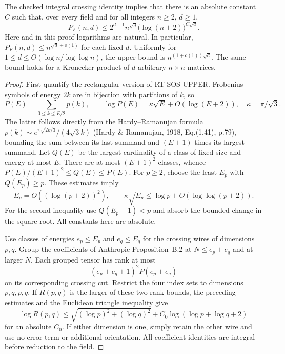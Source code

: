 \begin{proposition}
\label{pg:multicut-upper}
The checked integral crossing identity implies that there is an
absolute constant $C$ such that, over every field and for all integers
$n\geq2$, $d\geq1$,
\[
 P_F(n,d)\leq
 2^{d-1} n^{\sqrt d}\bigl(\log(n+2)\bigr)^{C\sqrt d}.
 \tag{PG-MULTICUT-upper}
\]
Here and in this proof logarithms are natural. In particular,
$P_F(n,d)\leq n^{\sqrt d+o(1)}$ for each fixed $d$. Uniformly for
$1\leq d\leq O(\log n/\log\log n)$, the upper bound is
$n^{(1+o(1))\sqrt d}$. The same bound holds for a Kronecker product
of $d$ arbitrary $n\times n$ matrices.
\end{proposition}
\begin{proof}
First quantify the rectangular version of RT-SOS-UPPER. Frobenius
symbols of energy $2k$ are in bijection with partitions of $k$, so
\[
 P(E)=\sum_{0\leq k\leq E/2}p(k),\qquad
 \log P(E)=\kappa\sqrt E+O(\log(E+2)),\quad
 \kappa=\pi/\sqrt3.
 \tag{PG-MULTICUT-count}
\]
The latter follows directly from the Hardy--Ramanujan formula
$p(k)\sim e^{\pi\sqrt{2k/3}}/(4\sqrt3 k)$ (Hardy \& Ramanujan,
1918, Eq.(1.41), p.79), bounding the sum between its last summand
and $(E+1)$ times its largest summand. Let $Q(E)$ be the largest
cardinality of a class of fixed size and energy at most $E$.
There are at most $(E+1)^2$ classes, whence
$P(E)/(E+1)^2\leq Q(E)\leq P(E)$.
For $p\geq2$, choose the least $E_p$ with $Q(E_p)\geq p$.
These estimates imply
\[
 E_p=O((\log(p+2))^2),\qquad
 \kappa\sqrt{E_p}\leq\log p+O(\log\log(p+2)).
\]
For the second inequality use $Q(E_p-1)<p$ and absorb the bounded
change in the square root. All constants here are absolute.

Use classes of energies $e_p\leq E_p$ and $e_q\leq E_q$ for the
crossing wires of dimensions $p,q$. Group the coefficients of
Anthropic Proposition~B.2 at $N\leq e_p+e_q$ and at larger $N$.
Each grouped tensor has rank at most
\[
 (e_p+e_q+1)^2P(e_p+e_q)
\]
on its corresponding crossing cut. Restrict the four index sets
to dimensions $p,q,p,q$. If $R(p,q)$ is the larger of these two
rank bounds, the preceding estimates and the Euclidean triangle
inequality give
\[
 \log R(p,q)\leq
 \sqrt{(\log p)^2+(\log q)^2}
 +C_0\log(\log p+\log q+2)
 \tag{PG-MULTICUT-merge}
\]
for an absolute $C_0$. If either dimension is one, simply retain
the other wire and use no error term or additional orientation.
All coefficient identities are integral before reduction to the field.


\end{proof}
